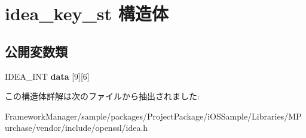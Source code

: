 \hypertarget{structidea__key__st}{}\section{idea\+\_\+key\+\_\+st 構造体}
\label{structidea__key__st}
\subsection*{公開変数類}
\begin{DoxyCompactItemize}
\item 
\hypertarget{structidea__key__st_aa6ba7317b0562f951492683464c0035e}{}I\+D\+E\+A\+\_\+\+I\+N\+T {\bfseries data} \mbox{[}9\mbox{]}\mbox{[}6\mbox{]}\label{structidea__key__st_aa6ba7317b0562f951492683464c0035e}

\end{DoxyCompactItemize}


この構造体詳解は次のファイルから抽出されました\+:\begin{DoxyCompactItemize}
\item 
Framework\+Manager/sample/packages/\+Project\+Package/i\+O\+S\+Sample/\+Libraries/\+M\+Purchase/vendor/include/openssl/idea.\+h\end{DoxyCompactItemize}
